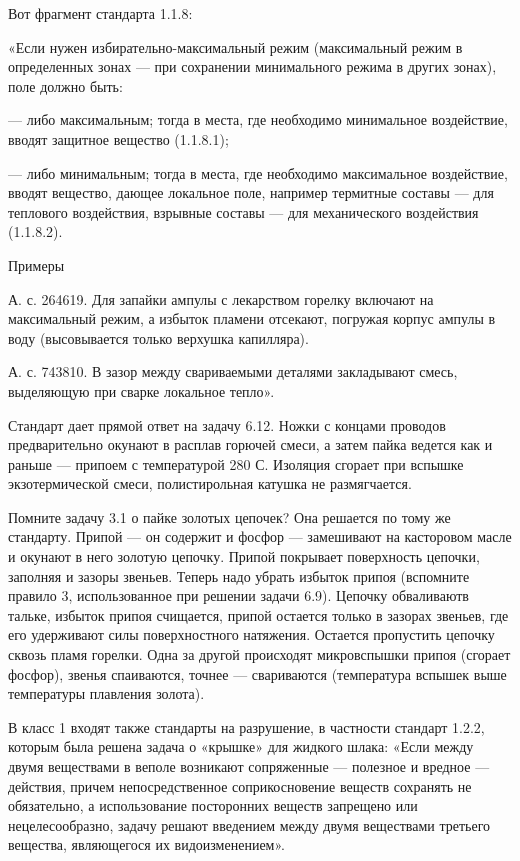 Вот фрагмент стандарта 1.1.8:

«Если  нужен  избирательно-максимальный  режим (максимальный  режим  в
определенных  зонах  — при  сохранении  минимального  режима в  других
зонах), поле должно быть:

—  либо  максимальным;  тогда  в  места,  где  необходимо  минимальное
воздействие, вводят защитное вещество (1.1.8.1);

—  либо  минимальным;  тогда  в  места,  где  необходимо  максимальное
воздействие,   вводят  вещество,   дающее  локальное   поле,  например
термитные составы — для теплового  воздействия, взрывные составы — для
механического воздействия (1.1.8.2).



Примеры


А.  с. 264619.  Для запайки  ампулы с  лекарством горелку  включают на
максимальный режим, а избыток пламени отсекают, погружая корпус ампулы
в воду (высовывается только верхушка капилляра).

А. с. 743810.  В зазор между свариваемыми  деталями закладывают смесь,
выделяющую при сварке локальное тепло».

Стандарт дает  прямой ответ на  задачу 6.12. Ножки с  концами проводов
предварительно окунают в расплав горючей  смеси, а затем пайка ведется
как и  раньше — припоем  с температурой  280 С. Изоляция  сгорает при
вспышке экзотермической смеси, полистирольная катушка не размягчается.

Помните задачу  3.1 о пайке золотых  цепочек? Она решается по  тому же
стандарту. Припой  — он содержит  и фосфор — замешивают  на касторовом
масле и окунают  в него золотую цепочку.  Припой покрывает поверхность
цепочки, заполняя и зазоры звеньев.  Теперь надо убрать избыток припоя
(вспомните правило 3, использованное  при решении задачи 6.9). Цепочку
обваливаютв тальке, избыток припоя счищается, припой остается только в
зазорах  звеньев, где  его удерживают  силы поверхностного  натяжения.
Остается  пропустить  цепочку сквозь  пламя  горелки.  Одна за  другой
происходят  микровспышки припоя  (сгорает фосфор),  звенья спаиваются,
точнее —  свариваются (температура вспышек выше  температуры плавления
золота).

В класс 1  входят также стандарты на разрушение,  в частности стандарт
1.2.2,  которым  была решена  задача  о  «крышке» для  жидкого  шлака:
«Если  между  двумя  веществами   в  веполе  возникают  сопряженные  —
полезное и вредное — действия, причем непосредственное соприкосновение
веществ сохранять не обязательно,  а использование посторонних веществ
запрещено  или нецелесообразно,  задачу решают  введением между  двумя
веществами третьего вещества, являющегося их видоизменением».

